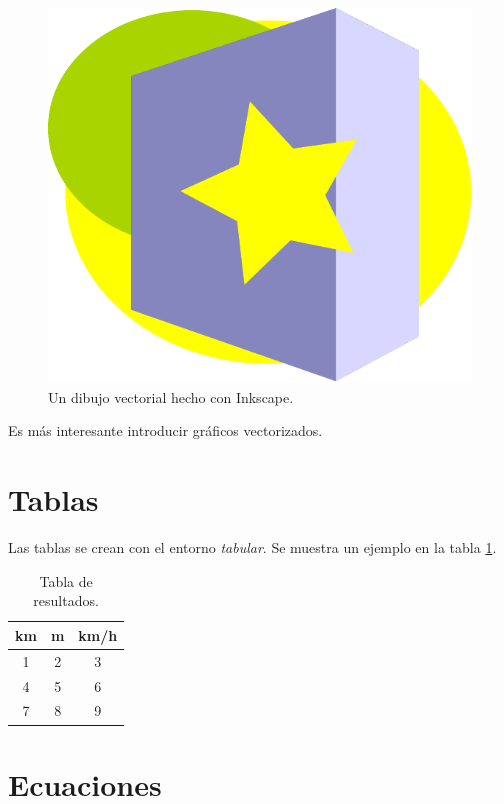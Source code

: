 \documentclass[a4,12pt]{article}
\begin{document}
\begin{figure}[h]
\begin{center}
\includegraphics[width=0.5\linewidth]{imagenes/dibujo}
\end{center}
\caption{Un dibujo vectorial hecho con Inkscape.}
\label{fig:monigote}
\end{figure}

Es más interesante introducir gráficos vectorizados.

\section{Tablas}

Las tablas se crean con el entorno \emph{tabular}. Se muestra un ejemplo en la tabla \ref{tab:resul}.

\begin{table}[h]
\begin{center}
\begin{tabular}{c|c|c} %
\textbf{km} & \textbf{m} & \textbf{km/h} \\
\hline
\hline
1 & 2 & 3 \\
\hline
4 & 5 & 6 \\
\hline
7 & 8 & 9
\end{tabular}
\end{center}
\caption{Tabla de resultados.}
\label{tab:resul}
\end{table}

\section{Ecuaciones}
\end{document}
